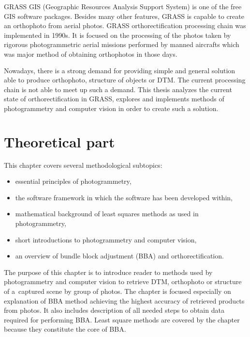 \documentclass[a4paper,12pt]{article}
\begin{document}
GRASS GIS  (Geographic Resources Analysis Support System) \cite{neteler2012grass}
is one of the free GIS software packages. 
Besides many other features, GRASS is capable to create an orthophoto from aerial photos.
GRASS orthorectification processing chain was implemented in 1990s.
It is focused on the processing of the photos taken by rigorous 
photogrammetric aerial missions performed by manned aircrafts which was 
major method of obtaining orthophotos in those days. 

Nowadays, there is a strong demand for  providing simple and general solution 
 able to produce orthophoto, structure of objects or 
DTM. The current processing chain is not able to meet up such a demand.
 This thesis analyzes the current state of orthorectification in GRASS,
explores and implements methods of photogrammetry and computer vision in order 
to create such a solution.

\newpage
\section{Theoretical part}

This chapter covers several methodological subtopics:
\begin{itemize}
\item essential principles of photogrammetry,
\item the software framework in which the software has been developed within, 
\item mathematical background of least squares methods as used in photogrammetry,
\item short introductions to photogrammetry and computer vision,
\item an overview of bundle block adjustment (BBA) and orthorectification.
\end{itemize} 

The purpose of this chapter is to introduce reader to methods used by photogrammetry and computer vision
to retrieve DTM, orthophoto or structure of a~captured scene by group of photos. 
The chapter is focused especially on 
explanation of BBA method achieving the highest accuracy of retrieved products from photos.  
It also includes description of all needed steps to obtain data required for performing BBA. 
Least square methods are covered by the chapter because they constitute the core of BBA.

\end{document}
